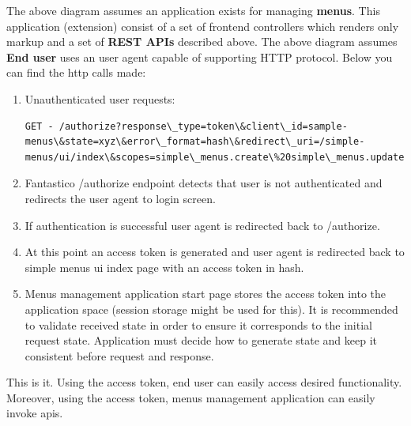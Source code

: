 \documentclass[letterpaper,10pt,english]{sphinxmanual}
\begin{document}
The above diagram assumes an application exists for managing \textbf{menus}. This application (extension) consist of a set of frontend
controllers which renders only markup and a set of \textbf{REST APIs} described above. The above diagram assumes \textbf{End user} uses an
user agent capable of supporting HTTP protocol. Below you can find the http calls made:
\begin{enumerate}
\item {} 
Unauthenticated user requests:

\begin{Verbatim}[commandchars=\\\{\}]
GET - /authorize?response\_type=token\&client\_id=sample-menus\&state=xyz\&error\_format=hash\&redirect\_uri=/simple-menus/ui/index\&scopes=simple\_menus.create\%20simple\_menus.update\%20simple\_menus.delete
\end{Verbatim}

\item {} 
Fantastico /authorize endpoint detects that user is not authenticated and redirects the user agent to login screen.

\item {} 
If authentication is successful user agent is redirected back to /authorize.

\item {} 
At this point an access token is generated and user agent is redirected back to simple menus ui index page with an access token in hash.

\item {} 
Menus management application start page stores the access token into the application space (session storage might be used for this).
It is recommended to validate received state in order to ensure it corresponds to the initial request state. Application must decide
how to generate state and keep it consistent before request and response.

\end{enumerate}

This is it. Using the access token, end user can easily access desired functionality. Moreover, using the access token,
menus management application can easily invoke apis.
\end{document}
